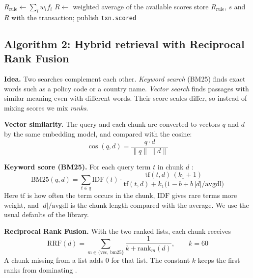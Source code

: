\documentclass[oneside,a4paper,12pt]{report}
\begin{document}
\begin{algorithm}[H]
\DontPrintSemicolon
\caption{Risk scoring and case creation}
$R_{\mathrm{rule}} \leftarrow \sum_i w_i f_i$\;
$R \leftarrow$ weighted average of the available scores\;
store $R_{\mathrm{rule}}$, $s$ and $R$ with the transaction; publish \texttt{txn.scored}\;
\end{algorithm}

\subsection{Algorithm 2: Hybrid retrieval with Reciprocal Rank Fusion}
\textbf{Idea.} Two searches complement each other. \emph{Keyword search} (BM25) finds exact words such as a policy code or a country name. \emph{Vector search} finds passages with similar meaning even with different words. Their score scales differ, so instead of mixing scores we mix \emph{ranks}.

\textbf{Vector similarity.} The query and each chunk are converted to vectors $q$ and $d$ by the same embedding model, and compared with the cosine:
\begin{equation}
  \cos(q,d) = \frac{q \cdot d}{\lVert q \rVert \, \lVert d \rVert}
\end{equation}

\textbf{Keyword score (BM25).} For each query term $t$ in chunk $d$ \cite{robertson2009bm25}:
\begin{equation}
  \mathrm{BM25}(q,d) = \sum_{t \in q} \mathrm{IDF}(t) \cdot \frac{\mathrm{tf}(t,d)\,(k_1 + 1)}{\mathrm{tf}(t,d) + k_1\bigl(1 - b + b\,|d|/\mathrm{avgdl}\bigr)}
\end{equation}
Here $\mathrm{tf}$ is how often the term occurs in the chunk, $\mathrm{IDF}$ gives rare terms more weight, and $|d|/\mathrm{avgdl}$ is the chunk length compared with the average. We use the usual defaults of the library.

\textbf{Reciprocal Rank Fusion.} With the two ranked lists, each chunk receives
\begin{equation}
  \mathrm{RRF}(d) = \sum_{m \in \{\mathrm{vec},\,\mathrm{bm25}\}} \frac{1}{k + \mathrm{rank}_m(d)}, \qquad k = 60
\end{equation}
A chunk missing from a list adds 0 for that list. The constant $k$ keeps the first ranks from dominating \cite{cormack2009rrf}.
\end{document}
